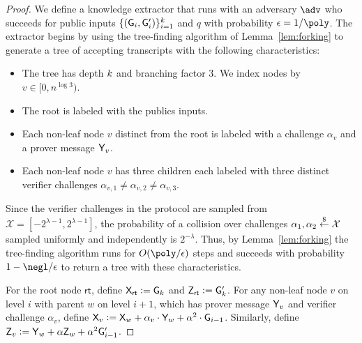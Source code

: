 \documentclass[12pt]{article}
\theoremstyle{Definition}
\begin{document}
	\begin{proof}
		We define a knowledge extractor that runs with an adversary $\adv$ who succeeds for public inputs $\{(\mathsf{G}_i,\mathsf{G}_i')\}_{i=1}^{k}$ and $q$ with probability $\epsilon = 1/\poly$. The extractor begins by using the tree-finding algorithm of Lemma~\ref{lem:forking} to generate a tree of accepting transcripts with the following characteristics: 

\begin{itemize}
\item The tree has depth $k$ and branching factor $3$. We index nodes by $v \in [0, n^{\log 3})$.
\item The root is labeled with the publics inputs. 
\item Each non-leaf node $v$ distinct from the root is labeled with a challenge $\alpha_{v}$ and a prover message $\mathsf{Y}_v$. 
\item Each non-leaf node $v$ has three children each labeled with three distinct verifier challenges 
$\alpha_{v,1} \neq \alpha_{v,2} \neq \alpha_{v,3}$.

\end{itemize} 

Since the verifier challenges in the protocol are sampled from $\mathcal{X} = [-2^{\lambda -1}, 2^{\lambda -1}]$, the probability of a collision over challenges $\alpha_1, \alpha_2 \overset{\$}{\gets} \mathcal{X}$ sampled uniformly and independently is $2^{-\lambda}$. Thus, by Lemma~\ref{lem:forking} the tree-finding algorithm runs for $O(\poly/\epsilon)$ steps and succeeds with probability $1 - \negl/\epsilon$ to return a tree with these characteristics.

For the root node $\textsf{rt}$, define $\mathsf{X}_\textsf{rt} \mathrel{\mathop:}= \mathsf{G}_k$ and $\mathsf{Z}_\textsf{rt} \mathrel{\mathop:}= \mathsf{G}'_k$. For any non-leaf node $v$ on level $i$ with parent $w$ on level $i+1$, which has prover message $\mathsf{Y}_v$ and verifier challenge $\alpha_v$, define $\mathsf{X}_v \mathrel{\mathop:}= \mathsf{X}_w + \alpha_v \cdot \mathsf{Y}_w + \alpha^2 \cdot \mathsf{G}_{i-1}$. Similarly, define $\mathsf{Z}_v \mathrel{\mathop:}= \mathsf{Y}_w + \alpha \mathsf{Z}_w + \alpha^2 \mathsf{G}'_{i-1}$.


\end{proof}
\end{document}
